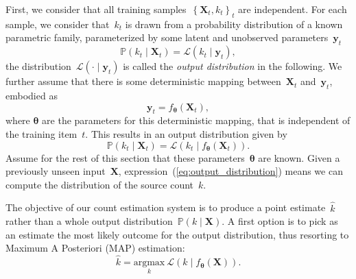 First, we consider that all training samples~$\left\{\mathbf{X}_t,k_t\right\}_t$ are independent.
For each sample, we consider that~$k_t$ is drawn from a probability distribution of a known parametric family, parameterized by some latent and unobserved parameters~$\mathbf{y}_t$
\begin{equation}
\mathbb{P}\left(k_{t}\mid\mathbf{X}_{t}\right)=\mathcal{L}\left(k_{t}\mid \mathbf{y}_{t}\right),
\end{equation}
%
%
the distribution~$\mathcal{L}\left(\cdot\mid \mathbf{y}_{t}\right)$ is called the \textit{output distribution} in the following.
We further assume that there is some deterministic mapping between~$\mathbf{X}_t$ and~$\mathbf{y}_t$, embodied as
\begin{equation}
\mathbf{y}_{t}=f_{\boldsymbol{\theta}}\left(\mathbf{X}_{t}\right),
\end{equation}
where $\boldsymbol{\theta}$ are the parameters for this deterministic mapping, that is independent of the training item~$t$. This results in an output distribution given by
\begin{equation}
\mathbb{P}\left(k_{t}\mid\mathbf{X}_{t}\right)=\mathcal{L}\left(k_{t}\mid f_{\boldsymbol{\theta}}\left(\mathbf{X}_{t}\right)\right).\label{eq:output_distribution}
\end{equation}
Assume for the rest of this section that these parameters~$\boldsymbol{\theta}$ are known.
Given a previously unseen input~$\mathbf{X}$, expression~(\ref{eq:output_distribution}) means we can compute the distribution of the source count~$k$.

The objective of our count estimation system is to produce a point estimate~$\hat{k}$ rather than a whole output distribution~$\mathbb{P}\left(k\mid\mathbf{X}\right)$.
A first option is to pick as an estimate the most likely outcome for the output distribution, thus resorting to Maximum A Posteriori (MAP) estimation:
\begin{equation}
\hat{k}=\underset{k}{\text{argmax}}\ \mathcal{L}\left(k\mid f_{\boldsymbol{\theta}}\left(\mathbf{X}\right)\right).
\end{equation}

